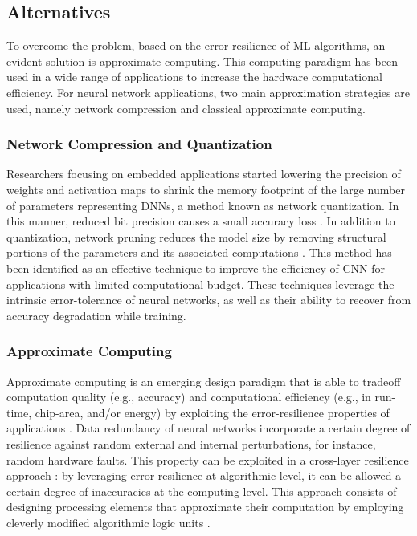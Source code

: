 \subsection{Alternatives}
To overcome the problem, based on the error-resilience of ML algorithms, an evident solution is approximate computing. This computing paradigm has been used in a wide range of applications to increase the hardware computational efficiency\cite{han2013approximate}. For neural network applications, two main approximation strategies are used, namely network compression and classical approximate computing\cite{bouvier2019spiking}.

\subsubsection{Network Compression and Quantization}
Researchers focusing on embedded applications started lowering the precision of weights and activation maps to shrink the memory footprint of the large number of parameters representing DNNs, a method known as network quantization. In this manner, reduced bit precision causes a small accuracy loss \cite{courbariaux2015binaryconnect, han2015deep, hubara2017quantized, rastegari2016xnor}. In addition to quantization, network pruning reduces the model size by removing structural portions of the parameters and its associated computations \cite{lecun1989optimal,hassibi1992second}. This method has been identified as an effective technique to improve the efficiency of CNN for applications with limited computational budget\cite{molchanov2016pruning,li2016pruning, liu2018rethinking}. These techniques leverage the intrinsic error-tolerance of neural networks, as well as their ability to recover from accuracy degradation while training.

\subsubsection{Approximate Computing}
Approximate computing is an emerging design paradigm that is able to tradeoff computation quality (e.g., accuracy) and computational efficiency (e.g., in run-time, chip-area, and/or energy) by exploiting the error-resilience properties of applications \cite{gillani2020exploiting, zhang2015approxann}. Data redundancy of neural networks incorporate a certain degree of resilience against random external and internal perturbations, for instance, random hardware faults. This property can be exploited in a cross-layer resilience approach \cite{carter2010design}: by leveraging error-resilience at algorithmic-level, it can be allowed a certain degree of inaccuracies at the computing-level. This approach consists of designing processing elements that approximate their computation by employing cleverly modified algorithmic logic units \cite{han2013approximate}. 

